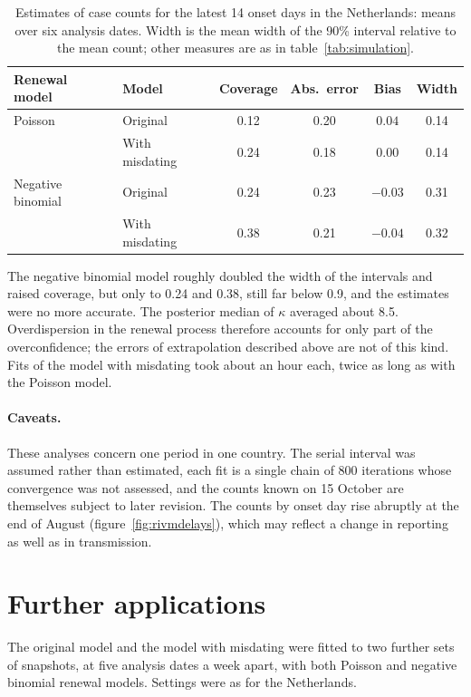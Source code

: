 \documentclass[11pt,a4paper]{article}
\begin{document}
\begin{table}[h]
\centering
\begin{tabular}{llcccc}
\toprule
Renewal model & Model & Coverage & Abs.\ error & Bias & Width \\
\midrule
Poisson & Original & 0.12 & 0.20 & $0.04$ & 0.14 \\
 & With misdating & 0.24 & 0.18 & $0.00$ & 0.14 \\
\addlinespace
Negative binomial & Original & 0.24 & 0.23 & $-0.03$ & 0.31 \\
 & With misdating & 0.38 & 0.21 & $-0.04$ & 0.32 \\
\bottomrule
\end{tabular}
\caption{Estimates of case counts for the latest 14 onset days in the
Netherlands: means over six analysis dates. Width is the mean width of the 90\%
interval relative to the mean count; other measures are as in
table~\ref{tab:simulation}.}
\label{tab:netherlandsnb}
\end{table}

The negative binomial model roughly doubled the width of the intervals and
raised coverage, but only to 0.24 and 0.38, still far below 0.9, and the
estimates were no more accurate. The posterior median of $\kappa$ averaged
about 8.5. Overdispersion in the renewal process therefore accounts for only
part of the overconfidence; the errors of extrapolation described above are
not of this kind. Fits of the model with misdating took about an hour each,
twice as long as with the Poisson model.

\paragraph{Caveats.} These analyses concern one period in one country. The
serial interval was assumed rather than estimated, each fit is a single chain
of 800 iterations whose convergence was not assessed, and the counts known on
15 October are themselves subject to later revision. The counts by onset day
rise abruptly at the end of August (figure~\ref{fig:rivmdelays}), which may
reflect a change in reporting as well as in transmission.

\section{Further applications}\label{sec:otherdata}

The original model and the model with misdating were fitted to two further
sets of snapshots, at five analysis dates a week apart, with both Poisson and
negative binomial renewal models. Settings were as for the Netherlands.
\end{document}
